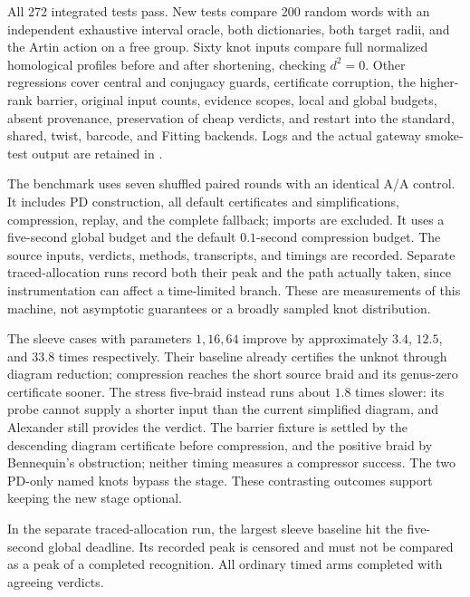 All 272 integrated tests pass. New tests compare 200 random words with an
independent exhaustive interval oracle, both dictionaries, both target
radii, and the Artin action on a free group. Sixty knot inputs compare full
normalized homological profiles before and after shortening, checking
$d^2=0$. Other regressions cover central and conjugacy guards, certificate
corruption, the higher-rank barrier, original input counts, evidence scopes,
local and global budgets, absent provenance, preservation of cheap verdicts,
and restart into the standard, shared, twist, barcode, and Fitting backends.
Logs and the actual gateway smoke-test output are retained in
.



The benchmark uses seven shuffled paired rounds with an identical A/A
control. It includes PD construction, all default certificates and
simplifications, compression, replay, and the complete fallback; imports
are excluded. It uses a five-second global budget and the default
$0.1$-second compression budget. The source inputs, verdicts, methods,
transcripts, and timings are recorded. Separate traced-allocation runs
record both their peak and the path actually taken, since instrumentation
can affect a time-limited branch. These are measurements of this machine,
not asymptotic guarantees or a broadly sampled knot distribution.

The sleeve cases with parameters $1,16,64$ improve by approximately
$3.4$, $12.5$, and $33.8$ times respectively. Their baseline already
certifies the unknot through diagram reduction; compression reaches the
short source braid and its genus-zero certificate sooner. The stress
five-braid instead runs about $1.8$ times slower: its probe cannot supply
a shorter input than the current simplified diagram, and Alexander still
provides the verdict. The barrier fixture is settled by the descending
diagram certificate before compression, and the positive braid by
Bennequin's obstruction; neither timing measures a compressor success.
The two PD-only named knots bypass the stage. These contrasting outcomes
support keeping the new stage optional.

In the separate traced-allocation run, the largest sleeve baseline hit the
five-second global deadline. Its recorded peak is censored and must not be
compared as a peak of a completed recognition. All ordinary timed arms
completed with agreeing verdicts.
